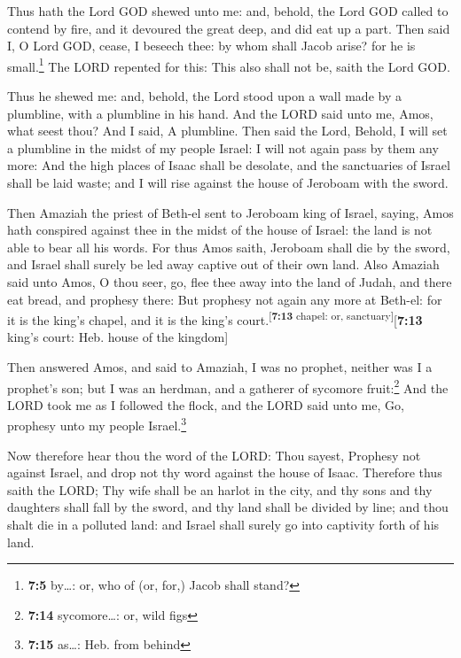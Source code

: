  Thus hath the Lord GOD shewed unto me: and, behold, the
Lord GOD called to contend by fire, and it devoured the great deep, and
did eat up a part.  Then said I, O Lord GOD, cease, I
beseech thee: by whom shall Jacob arise? for he is small.\footnote{\textbf{7:5}
  by\ldots: or, who of (or, for,) Jacob shall stand?}  The
LORD repented for this: This also shall not be, saith the Lord GOD.

 Thus he shewed me: and, behold, the Lord stood upon a
wall made by a plumbline, with a plumbline in his hand. 
And the LORD said unto me, Amos, what seest thou? And I said, A
plumbline. Then said the Lord, Behold, I will set a plumbline in the
midst of my people Israel: I will not again pass by them any more:
 And the high places of Isaac shall be desolate, and the
sanctuaries of Israel shall be laid waste; and I will rise against the
house of Jeroboam with the sword.

 Then Amaziah the priest of Beth-el sent to Jeroboam king
of Israel, saying, Amos hath conspired against thee in the midst of the
house of Israel: the land is not able to bear all his words.
 For thus Amos saith, Jeroboam shall die by the sword,
and Israel shall surely be led away captive out of their own land.
 Also Amaziah said unto Amos, O thou seer, go, flee thee
away into the land of Judah, and there eat bread, and prophesy there:
 But prophesy not again any more at Beth-el: for it is
the king's chapel, and it is the king's
court.\textsuperscript{{[}\textbf{7:13} chapel: or,
sanctuary{]}}{[}\textbf{7:13} king's court: Heb. house of the kingdom{]}

 Then answered Amos, and said to Amaziah, I was no
prophet, neither was I a prophet's son; but I was an herdman, and a
gatherer of sycomore fruit:\footnote{\textbf{7:14} sycomore\ldots: or,
  wild figs}  And the LORD took me as I followed the
flock, and the LORD said unto me, Go, prophesy unto my people
Israel.\footnote{\textbf{7:15} as\ldots: Heb. from behind}

 Now therefore hear thou the word of the LORD: Thou
sayest, Prophesy not against Israel, and drop not thy word against the
house of Isaac.  Therefore thus saith the LORD; Thy wife
shall be an harlot in the city, and thy sons and thy daughters shall
fall by the sword, and thy land shall be divided by line; and thou shalt
die in a polluted land: and Israel shall surely go into captivity forth
of his land.

